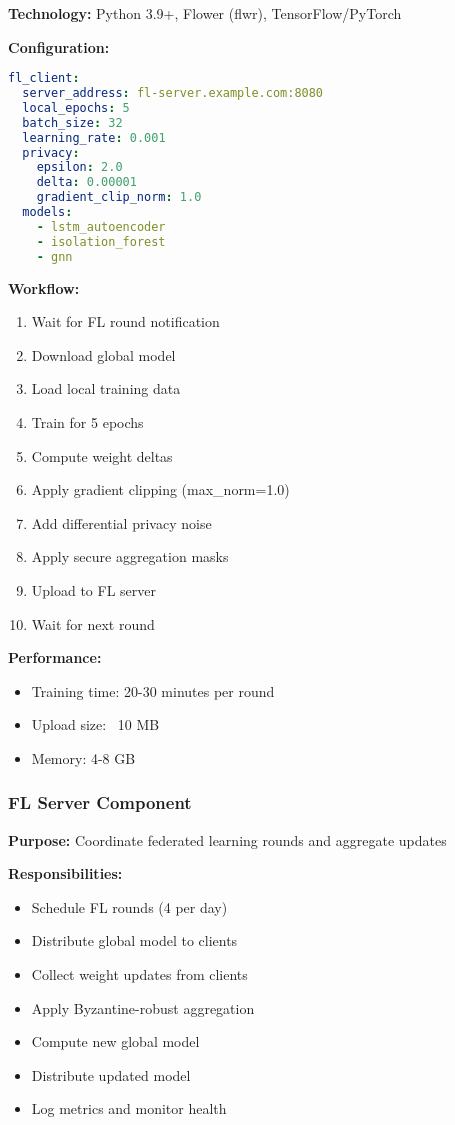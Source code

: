 \documentclass[12pt,a4paper]{article}
\begin{document}
\textbf{Technology:} Python 3.9+, Flower (flwr), TensorFlow/PyTorch

\textbf{Configuration:}
\begin{lstlisting}[language=yaml]
fl_client:
  server_address: fl-server.example.com:8080
  local_epochs: 5
  batch_size: 32
  learning_rate: 0.001
  privacy:
    epsilon: 2.0
    delta: 0.00001
    gradient_clip_norm: 1.0
  models:
    - lstm_autoencoder
    - isolation_forest
    - gnn
\end{lstlisting}

\textbf{Workflow:}
\begin{enumerate}[leftmargin=1cm,itemsep=0pt]
    \item Wait for FL round notification
    \item Download global model
    \item Load local training data
    \item Train for 5 epochs
    \item Compute weight deltas
    \item Apply gradient clipping (max\_norm=1.0)
    \item Add differential privacy noise
    \item Apply secure aggregation masks
    \item Upload to FL server
    \item Wait for next round
\end{enumerate}

\textbf{Performance:}
\begin{itemize}[leftmargin=1cm,itemsep=0pt]
    \item Training time: 20-30 minutes per round
    \item Upload size: ~10 MB
    \item Memory: 4-8 GB
\end{itemize}

\subsubsection{FL Server Component}

\textbf{Purpose:} Coordinate federated learning rounds and aggregate updates

\textbf{Responsibilities:}
\begin{itemize}[leftmargin=1cm,itemsep=0pt]
    \item Schedule FL rounds (4 per day)
    \item Distribute global model to clients
    \item Collect weight updates from clients
    \item Apply Byzantine-robust aggregation
    \item Compute new global model
    \item Distribute updated model
    \item Log metrics and monitor health
\end{itemize}
\end{document}
